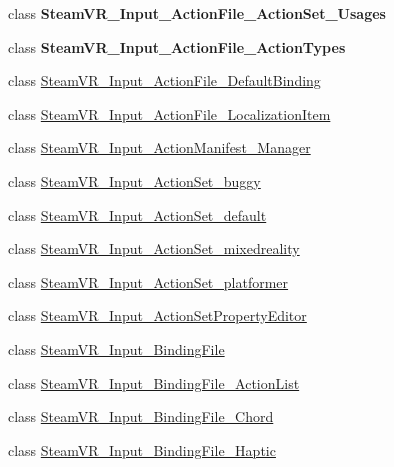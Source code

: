 \begin{DoxyCompactItemize}
\item 
class {\bfseries Steam\+V\+R\+\_\+\+Input\+\_\+\+Action\+File\+\_\+\+Action\+Set\+\_\+\+Usages}
\item 
class {\bfseries Steam\+V\+R\+\_\+\+Input\+\_\+\+Action\+File\+\_\+\+Action\+Types}
\item 
class \mbox{\hyperlink{class_valve_1_1_v_r_1_1_steam_v_r___input___action_file___default_binding}{Steam\+V\+R\+\_\+\+Input\+\_\+\+Action\+File\+\_\+\+Default\+Binding}}
\item 
class \mbox{\hyperlink{class_valve_1_1_v_r_1_1_steam_v_r___input___action_file___localization_item}{Steam\+V\+R\+\_\+\+Input\+\_\+\+Action\+File\+\_\+\+Localization\+Item}}
\item 
class \mbox{\hyperlink{class_valve_1_1_v_r_1_1_steam_v_r___input___action_manifest___manager}{Steam\+V\+R\+\_\+\+Input\+\_\+\+Action\+Manifest\+\_\+\+Manager}}
\item 
class \mbox{\hyperlink{class_valve_1_1_v_r_1_1_steam_v_r___input___action_set__buggy}{Steam\+V\+R\+\_\+\+Input\+\_\+\+Action\+Set\+\_\+buggy}}
\item 
class \mbox{\hyperlink{class_valve_1_1_v_r_1_1_steam_v_r___input___action_set__default}{Steam\+V\+R\+\_\+\+Input\+\_\+\+Action\+Set\+\_\+default}}
\item 
class \mbox{\hyperlink{class_valve_1_1_v_r_1_1_steam_v_r___input___action_set__mixedreality}{Steam\+V\+R\+\_\+\+Input\+\_\+\+Action\+Set\+\_\+mixedreality}}
\item 
class \mbox{\hyperlink{class_valve_1_1_v_r_1_1_steam_v_r___input___action_set__platformer}{Steam\+V\+R\+\_\+\+Input\+\_\+\+Action\+Set\+\_\+platformer}}
\item 
class \mbox{\hyperlink{class_valve_1_1_v_r_1_1_steam_v_r___input___action_set_property_editor}{Steam\+V\+R\+\_\+\+Input\+\_\+\+Action\+Set\+Property\+Editor}}
\item 
class \mbox{\hyperlink{class_valve_1_1_v_r_1_1_steam_v_r___input___binding_file}{Steam\+V\+R\+\_\+\+Input\+\_\+\+Binding\+File}}
\item 
class \mbox{\hyperlink{class_valve_1_1_v_r_1_1_steam_v_r___input___binding_file___action_list}{Steam\+V\+R\+\_\+\+Input\+\_\+\+Binding\+File\+\_\+\+Action\+List}}
\item 
class \mbox{\hyperlink{class_valve_1_1_v_r_1_1_steam_v_r___input___binding_file___chord}{Steam\+V\+R\+\_\+\+Input\+\_\+\+Binding\+File\+\_\+\+Chord}}
\item 
class \mbox{\hyperlink{class_valve_1_1_v_r_1_1_steam_v_r___input___binding_file___haptic}{Steam\+V\+R\+\_\+\+Input\+\_\+\+Binding\+File\+\_\+\+Haptic}}

\end{DoxyCompactItemize}
